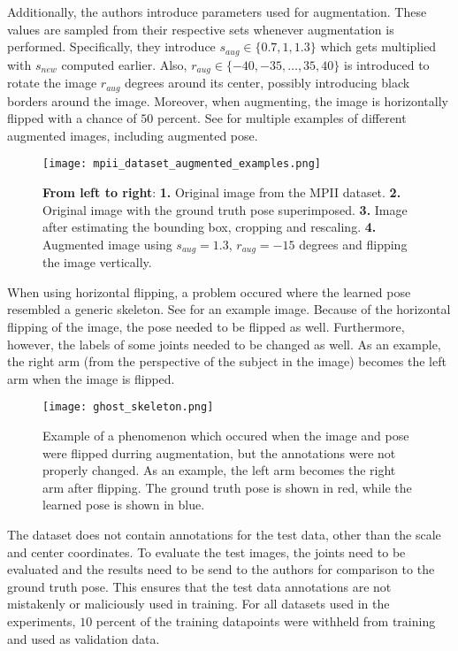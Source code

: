 Additionally, the authors introduce parameters used for augmentation.
These values are sampled from their respective sets whenever augmentation is performed.
Specifically, they introduce $s_{aug} \in \{0.7, 1, 1.3\}$ which gets multiplied with $s_{new}$ computed earlier.
Also, $r_{aug} \in \{-40, -35, \dots, 35, 40\}$ is introduced to rotate the image $r_{aug}$ degrees around its center, possibly introducing black borders around the image.
Moreover, when augmenting, the image is horizontally flipped with a chance of $50$ percent.
See  for multiple examples of different augmented images, including augmented pose. 

\begin{figure}[htb!]
    \centering
    \texttt{[image: mpii\_dataset\_augmented\_examples.png]}
    \caption{\textbf{From left to right}: \textbf{1.} Original image from the MPII dataset. \textbf{2.} Original image with the ground truth pose superimposed. \textbf{3.} Image after estimating the bounding box, cropping and rescaling. \textbf{4.} Augmented image using $s_{aug} = 1.3$, $r_{aug} = -15$ degrees and flipping the image vertically.}
    \label{fig:mpii_example_augmentation}
\end{figure}

When using horizontal flipping, a problem occured where the learned pose resembled a generic skeleton.
See  for an example image.
Because of the horizontal flipping of the image, the pose needed to be flipped as well.
Furthermore, however, the labels of some joints needed to be changed as well.
As an example, the right arm (from the perspective of the subject in the image) becomes the left arm when the image is flipped.

\begin{figure}[htb!]
    \centering
    \texttt{[image: ghost\_skeleton.png]}
    \caption{Example of a phenomenon which occured when the image and pose were flipped durring augmentation, but the annotations were not properly changed. As an example, the left arm becomes the right arm after flipping. The ground truth pose is shown in red, while the learned pose is shown in blue. }
    \label{fig:ghost_skeleton}
\end{figure}

The dataset does not contain annotations for the test data, other than the scale and center coordinates.
To evaluate the test images, the joints need to be evaluated and the results need to be send to the authors for comparison to the ground truth pose.
This ensures that the test data annotations are not mistakenly or maliciously used in training.
For all datasets used in the experiments, $10$ percent of the training datapoints were withheld from training and used as validation data.

